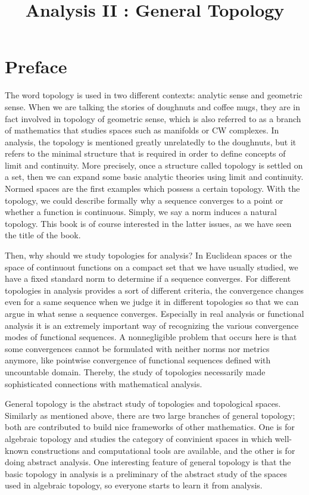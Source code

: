 \documentclass{../crs}
\title{Analysis II : General Topology}
\begin{document}
\maketitle
\tableofcontents

\frontmatter


\chapter*{Preface}

The word topology is used in two different contexts: analytic sense and geometric sense.
When we are talking the stories of doughnuts and coffee mugs, they are in fact involved in topology of geometric sense, which is also referred to as a branch of mathematics that studies spaces such as manifolds or CW complexes.
In analysis, the topology is mentioned greatly unrelatedly to the doughnuts, but it refers to the minimal structure that is required in order to define concepts of limit and continuity.
More precisely, once a structure called topology is settled on a set, then we can expand some basic analytic theories using limit and continuity.
Normed spaces are the first examples which possess a certain topology.
With the topology, we could describe formally why a sequence converges to a point or whether a function is continuous.
Simply, we say a norm induces a natural topology.
This book is of course interested in the latter issues, as we have seen the title of the book.

Then, why should we study topologies for analysis? 
In Euclidean spaces or the space of continuout functions on a compact set that we have usually studied, we have a fixed standard norm to determine if a sequence converges.
For different topologies in analysis provides a sort of different criteria, the convergence changes even for a same sequence when we judge it in different topologies so that we can argue in what sense a sequence converges.
Especially in real analysis or functional analysis it is an extremely important way of recognizing the various convergence modes of functional sequences.
A nonnegligible problem that occurs here is that some convergences cannot be formulated with neither norms nor metrics anymore, like pointwise convergence of functional sequences defined with uncountable domain.
Thereby, the study of topologies necessarily made sophisticated connections with mathematical analysis.

General topology is the abstract study of topologies and topological spaces.
Similarly as mentioned above, there are two large branches of general topology; both are contributed to build nice frameworks of other mathematics.
One is for algebraic topology and studies the category of convinient spaces in which well-known constructions and computational tools are available, and the other is for doing abstract analysis.
One interesting feature of general topology is that the basic topology in analysis is a preliminary of the abstract study of the spaces used in algebraic topology, so everyone starts to learn it from analysis.
\end{document}
